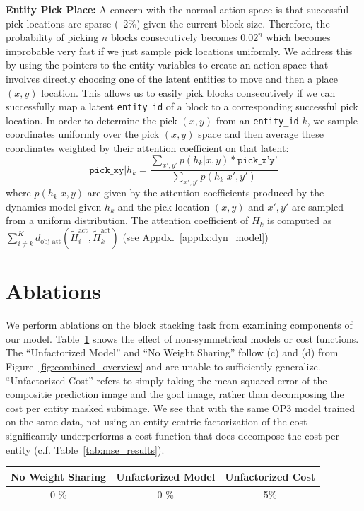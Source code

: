 \textbf{Entity Pick Place:} A concern with the normal action space is that successful pick locations are sparse (~2\%) given the current block size. Therefore, the probability of picking $n$ blocks consecutively becomes $0.02^n$ which becomes improbable very fast if we just sample pick locations uniformly. We address this by using the pointers to the entity variables to create an action space that involves directly choosing one of the latent entities to move and then a place $(x,y)$ location. This allows us to easily pick blocks consecutively if we can successfully map a latent \texttt{entity\_id} of a block to a corresponding successful pick location. In order to determine the pick $(x,y)$ from an \texttt{entity\_id} $k$, we sample coordinates uniformly over the pick $(x,y)$ space and then average these coordinates weighted by their attention coefficient on that latent:
$$
\texttt{pick\_xy} | h_k = \frac{\sum_{x',y'} p(h_k|x,y) * \texttt{pick\_x'y'} } {\sum_{x',y'} p(h_k|x',y')}
$$
where $p(h_k|x,y)$ are given by the attention coefficients produced by the dynamics model given $h_k$ and the pick location $(x,y)$ and $x',y'$ are sampled from a uniform distribution.
The attention coefficient of $H_k$ is computed as $\sum_{i\neq k}^K d_{\text{obj-att}}(\tilde{H}_i^{\text{act}}, \tilde{H}_k^{\text{act}})$ (see Appdx.~\ref{appdx:dyn_model})

\section{Ablations}
We perform ablations on the block stacking task from \cite{janner2018reasoning} examining components of our model. Table~\ref{tab:stage1_ablations} shows the effect of non-symmetrical models or cost functions. The ``Unfactorized Model'' and ``No Weight Sharing'' follow (c) and (d) from Figure~\ref{fig:combined_overview} and are unable to sufficiently generalize.
``Unfactorized Cost'' refers to simply taking the mean-squared error of the compositie prediction image and the goal image, rather than decomposing the cost per entity masked subimage.
We see that with the same OP3 model trained on the same data, not using an entity-centric factorization of the cost significantly underperforms a cost function that does decompose the cost per entity (c.f. Table~\ref{tab:mse_results}).
\begin{table}[h]
    \centering
    \begin{tabular}{ccc}
    \toprule
         No Weight Sharing & Unfactorized Model & Unfactorized Cost \\
     \midrule
          0 \% & 0 \% & 5\%\\
    \bottomrule
    \end{tabular}
    \label{tab:stage1_ablations}
\end{table}

